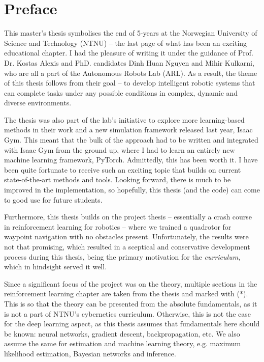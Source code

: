 \chapter*{Preface}

This master's thesis symbolises the end of 5-years at the Norwegian University of Science and Technology (NTNU) -- the last page of what has been an exciting educational chapter. I had the pleasure of writing it under the guidance of Prof. Dr. Kostas Alexis and PhD. candidates Dinh Huan Nguyen and Mihir Kulkarni, who are all a part of the Autonomous Robots Lab (ARL). As a result, the theme of this thesis follows from their goal -- to develop intelligent robotic systems that can complete tasks under any possible conditions in complex, dynamic and diverse environments. 

The thesis was also part of the lab's initiative to explore more learning-based methods in their work and a new simulation framework released last year, Isaac Gym. This meant that the bulk of the approach had to be written and integrated with Isaac Gym from the ground up, where I had to learn an entirely new machine learning framework, PyTorch. 
Admittedly, this has been worth it. I have been quite fortunate to receive such an exciting topic that builds on current state-of-the-art methods and tools. Looking forward, there is much to be improved in the implementation, so hopefully, this thesis (and the code) can come to good use for future students.

Furthermore, this thesis builds on the project thesis \cite{project_thesis} -- essentially a crash course in reinforcement learning for robotics -- where we trained a quadrotor for waypoint navigation with no obstacles present. Unfortunately, the results were not that promising, which resulted in a sceptical and conservative development process during this thesis, being the primary motivation for the \textit{curriculum}, which in hindsight served it well.

Since a significant focus of the project was on the theory, multiple sections in the reinforcement learning chapter are taken from the thesis and marked with (*). This is so that the theory can be presented from the absolute fundamentals, as it is not a part of NTNU's cybernetics curriculum. Otherwise, this is not the case for the deep learning aspect, as this thesis assumes that fundamentals here should be known: neural networks, gradient descent,  backpropagation, etc. We also assume the same for estimation and machine learning theory, e.g. maximum likelihood estimation, Bayesian networks and inference.